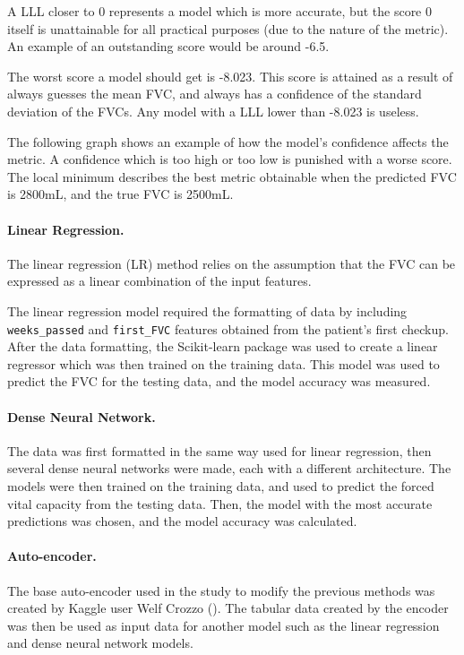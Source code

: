 \documentclass[12pt]{article}
\begin{document}
A LLL closer to 0 represents a model which is more accurate, but the score 0 itself is unattainable for all practical purposes (due to the nature of the metric). 
An example of an outstanding score would be around -6.5.

The worst score a model should get is -8.023. 
This score is attained as a result of always guesses the mean FVC, and always has a confidence of the standard deviation of the FVCs. 
Any model with a LLL lower than -8.023 is useless.

The following graph shows an example of how the model's confidence affects the metric. 
A confidence which is too high or too low is punished with a worse score. 
The local minimum describes the best metric obtainable when the predicted FVC is 2800mL, and the true FVC is 2500mL.

\paragraph*{Linear Regression.}

The linear regression (LR) method relies on the assumption that the FVC can be expressed as a linear combination of the input features. 

The linear regression model required the formatting of data by including {\tt weeks\_passed} and {\tt first\_FVC} features obtained from the patient's first checkup.
After the data formatting, the Scikit-learn package was used to create a linear regressor which was then trained on the training data.
This model was used to predict the FVC for the testing data, and the model accuracy was measured.

\paragraph*{Dense Neural Network.}

The data was first formatted in the same way used for linear regression, then several dense neural networks were made, each with a different architecture.
The models were then trained on the training data, and used to predict the forced vital capacity from the testing data.
Then, the model with the most accurate predictions was chosen, and the model accuracy was calculated.

\paragraph*{Auto-encoder.}

The base auto-encoder used in the study to modify the previous methods was created by Kaggle user Welf Crozzo (\cite{image2vec}). 
The tabular data created by the encoder was then be used as input data for another model such as the linear regression and dense neural network models.
\end{document}
